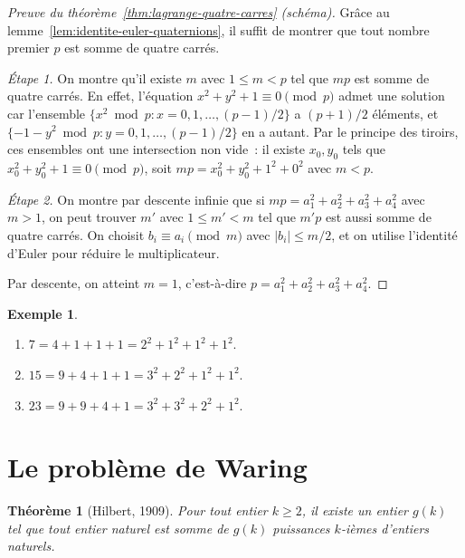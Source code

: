 \documentclass[12pt,a4paper,openany]{book}
\theoremstyle{definition}
\newtheorem{exemple}[definition]{Exemple}
\theoremstyle{plain}
\newtheorem{theoreme}[definition]{Théorème}
\theoremstyle{remark}
\newcommand{\abs}[1]{\left|#1\right|}
\begin{document}
\begin{proof}[Preuve du théorème~\ref{thm:lagrange-quatre-carres} (schéma)]
Grâce au lemme~\ref{lem:identite-euler-quaternions}, il suffit de montrer que tout nombre
premier $p$ est somme de quatre carrés.

\emph{Étape 1.} On montre qu'il existe $m$ avec $1 \leq m < p$ tel que $mp$ est somme de
quatre carrés. En effet, l'équation $x^2 + y^2 + 1 \equiv 0 \pmod{p}$ admet une solution
car l'ensemble $\{x^2 \bmod p : x = 0, 1, \ldots, (p-1)/2\}$ a $(p+1)/2$ éléments, et
$\{-1 - y^2 \bmod p : y = 0, 1, \ldots, (p-1)/2\}$ en a autant. Par le principe des
tiroirs, ces ensembles ont une intersection non vide~: il existe $x_0, y_0$ tels que
$x_0^2 + y_0^2 + 1 \equiv 0 \pmod{p}$, soit $mp = x_0^2 + y_0^2 + 1^2 + 0^2$ avec
$m < p$.

\emph{Étape 2.} On montre par descente infinie que si $mp = a_1^2 + a_2^2 + a_3^2 +
a_4^2$ avec $m > 1$, on peut trouver $m'$ avec $1 \leq m' < m$ tel que $m'p$ est aussi
somme de quatre carrés. On choisit $b_i \equiv a_i \pmod{m}$ avec $\abs{b_i} \leq m/2$,
et on utilise l'identité d'Euler pour réduire le multiplicateur.

Par descente, on atteint $m = 1$, c'est-à-dire $p = a_1^2 + a_2^2 + a_3^2 + a_4^2$.
\end{proof}

\begin{exemple}
\label{ex:sommes-quatre-carres}
\begin{enumerate}[label=(\alph*)]
  \item $7 = 4 + 1 + 1 + 1 = 2^2 + 1^2 + 1^2 + 1^2$.
  \item $15 = 9 + 4 + 1 + 1 = 3^2 + 2^2 + 1^2 + 1^2$.
  \item $23 = 9 + 9 + 4 + 1 = 3^2 + 3^2 + 2^2 + 1^2$.
\end{enumerate}
\end{exemple}

\section{Le problème de Waring}
\label{sec:probleme-waring}

\begin{theoreme}[Hilbert, 1909]
\label{thm:hilbert-waring}
Pour tout entier $k \geq 2$, il existe un entier $g(k)$ tel que tout entier naturel est
somme de $g(k)$ puissances $k$-ièmes d'entiers naturels.
\end{theoreme}
\end{document}
